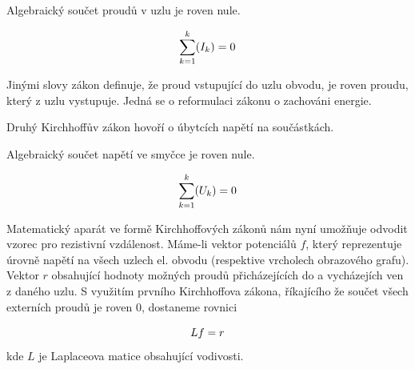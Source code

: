 \documentclass[czech, master, public, dept460, male, cpdeclaration, oneside]{diploma}
\begin{document}
\begin{definition}
	Algebraický součet proudů v uzlu je roven nule.
\end{definition}
\begin{equation}
\vspace*{+3.0mm}
\sum_{k = 1}^{k} (I_k) = 0 
\end{equation}

\noindent
Jinými slovy zákon definuje, že proud vstupující do uzlu obvodu, je roven proudu, který z uzlu vystupuje. Jedná se o reformulaci zákonu o zachováni energie. 

\noindent
Druhý Kirchhoffův zákon hovoří o úbytcích napětí na součástkách.
\begin{definition}
	Algebraický součet napětí ve smyčce je roven nule.
\end{definition}
\begin{equation}
\vspace*{+3.0mm}
\sum_{k = 1}^{k} (U_k) = 0 
\end{equation}

\noindent
Matematický aparát ve formě Kirchhoffových zákonů nám nyní umožňuje odvodit vzorec pro rezistivní vzdálenost. Máme-li vektor potenciálů $f$, který reprezentuje úrovně napětí na všech uzlech el. obvodu (respektive vrcholech obrazového grafu). Vektor $r$ obsahující hodnoty možných proudů přicházejících do a vycházejích ven z daného uzlu. S využitím prvního Kirchhoffova zákona, říkajícího že součet všech externích proudů je roven 0, dostaneme rovnici

\begin{equation}
\vspace*{+3.0mm}
Lf = r
\end{equation}
\noindent
kde $L$ je Laplaceova matice obsahující vodivosti. 
\end{document}

